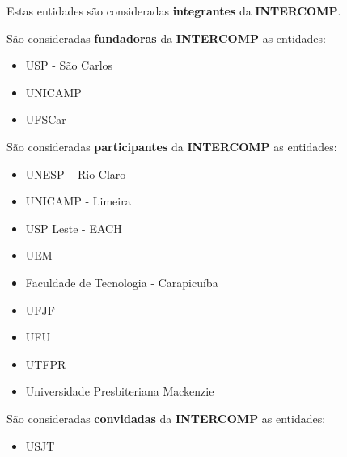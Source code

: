 \begin{article}
	\begin{xparagraph}
		Estas entidades são consideradas \textbf{integrantes} da \textbf{INTERCOMP}.
	\end{xparagraph}

	\begin{xparagraph}
		São consideradas \textbf{fundadoras} da \textbf{INTERCOMP} as entidades:
		\begin{itemize}[noitemsep,leftmargin=2\parindent]
			\item USP - São Carlos
			\item UNICAMP
			\item UFSCar
		\end{itemize}
	\end{xparagraph}

	\begin{xparagraph}
		São consideradas \textbf{participantes} da \textbf{INTERCOMP} as entidades:
		\begin{itemize}[noitemsep,leftmargin=2\parindent]
			\item UNESP – Rio Claro
			\item UNICAMP - Limeira
			\item USP Leste - EACH
			\item UEM
			\item Faculdade de Tecnologia - Carapicuíba
			\item UFJF
			\item UFU
			\item UTFPR
			\item Universidade Presbiteriana Mackenzie
		\end{itemize}
	\end{xparagraph}

	\begin{xparagraph}
		São consideradas \textbf{convidadas} da \textbf{INTERCOMP} as entidades:
		\begin{itemize}[noitemsep,leftmargin=2\parindent]
			\item USJT
		\end{itemize}
	\end{xparagraph}


\end{article}
